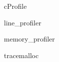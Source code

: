 \documentclass[a4paper]{article}
\title{}
\begin{document}
    \maketitle
    cProfile
    
    line\_profiler
    
    memory\_profiler
    
    tracemalloc
\end{document}
